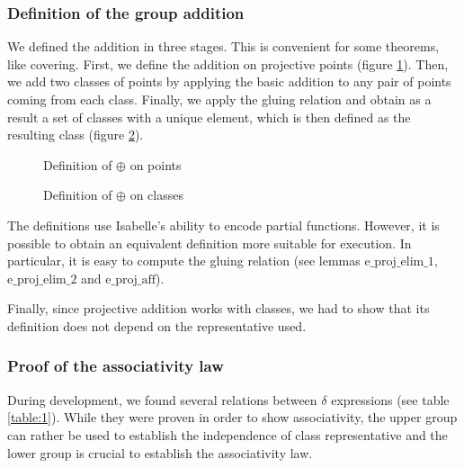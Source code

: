 \documentclass[runningheads]{llncs}
\begin{document}
\subsubsection{Definition of the group addition}

We defined the addition in three stages. This is convenient for some theorems, like covering. First, we define the addition on projective points (figure \ref{fig3}). Then, we add two classes of points by applying the basic addition to any pair of points coming from each class. Finally, we apply the gluing relation and obtain as a result a set of classes with a unique element, which is then defined as the resulting class (figure \ref{fig4}).

\begin{figure}
{}
\caption{Definition of $\oplus$ on points}
\label{fig3}
\end{figure}
\begin{figure}
	{}
	{}
	\caption{Definition of $\oplus$ on classes}
	\label{fig4}
\end{figure}

The definitions use Isabelle's ability to encode partial functions. However, it is possible to obtain an equivalent definition more suitable for execution. In particular, it is easy to compute the gluing relation (see lemmas $\text{e\_proj\_elim\_1}$, $\text{e\_proj\_elim\_2}$ and $\text{e\_proj\_aff}$). 

Finally, since projective addition works with classes, we had to show that its definition does not depend on the representative used. 

\subsubsection{Proof of the associativity law}

During development, we found several relations between $\delta$ expressions (see table \ref{table:1}). While they were proven in order to show associativity, the upper group can rather be used to establish the independence of class representative and the lower group is crucial to establish the associativity law.
\end{document}
